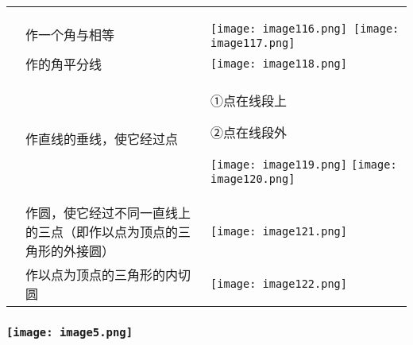 \begin{longtable}[]{@{}lll@{}}
\toprule
\endhead
& &\tabularnewline
& &\tabularnewline
& 作一个角与相等 &
\texttt{[image: image116.png]}~\texttt{[image: image117.png]}\tabularnewline
& 作的角平分线 &
\texttt{[image: image118.png]}\tabularnewline
\begin{minipage}[t]{0.30\columnwidth}\raggedright
\strut
\end{minipage} & \begin{minipage}[t]{0.30\columnwidth}\raggedright
作直线的垂线，使它经过点\strut
\end{minipage} & \begin{minipage}[t]{0.30\columnwidth}\raggedright
①点在线段上~~~~~

②点在线段外

\texttt{[image: image119.png]}
\texttt{[image: image120.png]}\strut
\end{minipage}\tabularnewline
& 作圆，使它经过不同一直线上的三点（即作以点为顶点的三角形的外接圆） &
\texttt{[image: image121.png]}\tabularnewline
& 作以点为顶点的三角形的内切圆 &
\texttt{[image: image122.png]}\tabularnewline
\bottomrule
\end{longtable}

\hypertarget{section-20}{%
\subsubsection{}\label{section-20}}

\hypertarget{ux5b66ux79d1ux7f51www.zxxk.com--ux6559ux80b2ux8d44ux6e90ux95e8ux6237ux63d0ux4f9bux8bd5ux9898ux8bd5ux5377ux6559ux6848ux8bfeux4ef6ux6559ux5b66ux8bbaux6587ux7d20ux6750ux7b49ux5404ux7c7bux6559ux5b66ux8d44ux6e90ux5e93ux4e0bux8f7dux8fd8ux6709ux5927ux91cfux4e30ux5bccux7684ux6559ux5b66ux8d44ux8baf-25}{%
\subsubsection{\texorpdfstring{\protect\texttt{[image: image5.png]}}{学科网(www.zxxk.com)-\/-教育资源门户，提供试题试卷、教案、课件、教学论文、素材等各类教学资源库下载，还有大量丰富的教学资讯！}}\label{ux5b66ux79d1ux7f51www.zxxk.com--ux6559ux80b2ux8d44ux6e90ux95e8ux6237ux63d0ux4f9bux8bd5ux9898ux8bd5ux5377ux6559ux6848ux8bfeux4ef6ux6559ux5b66ux8bbaux6587ux7d20ux6750ux7b49ux5404ux7c7bux6559ux5b66ux8d44ux6e90ux5e93ux4e0bux8f7dux8fd8ux6709ux5927ux91cfux4e30ux5bccux7684ux6559ux5b66ux8d44ux8baf-25}}

